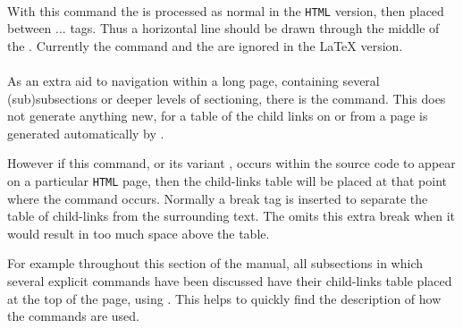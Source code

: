 %
\paragraph*{\texttt{}\label{strikeout}}
\begin{changebar}
With this command the  is processed as normal in the \texttt{HTML} version,
then placed between ... tags.
Thus a horizontal line should be drawn through the middle of the .\html{\\}
Currently the command and the  are ignored in the \LaTeX{} version.%
\end{changebar}%


%
\paragraph*{\label{tochlinks}}
\begin{changebar}
As an extra aid to navigation within a long page, 
containing several (sub)subsections or deeper levels of sectioning,
there is the  command.
This does not generate anything new, for a table of the child links
on or from a page is generated automatically by \latextohtml.

However if this command, or its variant ,
occurs within the source code to appear on a particular \texttt{HTML} page,
then the child-links table will be placed at that point
where the command occurs. 
Normally a break tag  is inserted to separate the table of child-links 
from the surrounding text. The  omits this extra break
when it would result in too much space above the table.

For example throughout this section of the manual, 
all subsections in which several explicit commands have been discussed
have their child-links table placed at the top of the page,
using . 
This helps to quickly find the description of how the commands are used.%
\end{changebar}%


%

